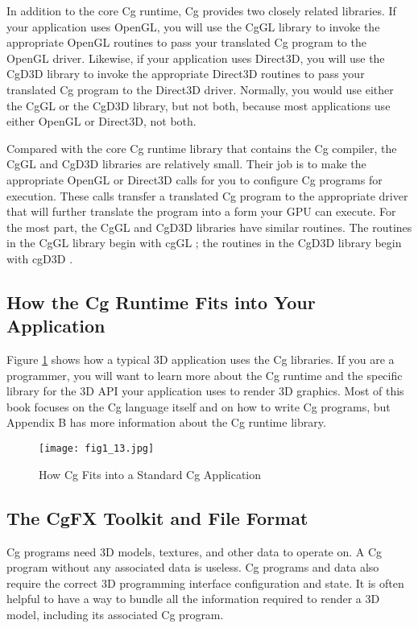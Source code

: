 \documentclass[../main.tex]{subfiles}
\begin{document}
In addition to the core Cg runtime, Cg provides two closely related libraries. If your application uses OpenGL, you will use the CgGL library to invoke the appropriate OpenGL routines to pass your translated Cg program to the OpenGL driver. Likewise, if your application uses Direct3D, you will use the CgD3D library to invoke the appropriate Direct3D routines to pass your translated Cg program to the Direct3D driver. Normally, you would use either the CgGL or the CgD3D library, but not both, because most applications use either OpenGL or Direct3D, not both.

Compared with the core Cg runtime library that contains the Cg compiler, the CgGL and CgD3D libraries are relatively small. Their job is to make the appropriate OpenGL or Direct3D calls for you to configure Cg programs for execution. These calls transfer a translated Cg program to the appropriate driver that will further translate the program into a form your GPU can execute. For the most part, the CgGL and CgD3D libraries have similar routines. The routines in the CgGL library begin with cgGL ; the routines in the CgD3D library begin with cgD3D .

\subsection*{How the Cg Runtime Fits into Your Application}

Figure \ref{fig:1-13} shows how a typical 3D application uses the Cg libraries. If you are a programmer, you will want to learn more about the Cg runtime and the specific library for the 3D API your application uses to render 3D graphics. Most of this book focuses on the Cg language itself and on how to write Cg programs, but Appendix B has more information about the Cg runtime library.

\begin{figure}
    \centering
    \texttt{[image: fig1\_13.jpg]}
    \caption{How Cg Fits into a Standard Cg Application}
    \label{fig:1-13}
\end{figure}

\subsection{The CgFX Toolkit and File Format}

Cg programs need 3D models, textures, and other data to operate on. A Cg program without any associated data is useless. Cg programs and data also require the correct 3D programming interface configuration and state. It is often helpful to have a way to bundle all the information required to render a 3D model, including its associated Cg program.
\end{document}
